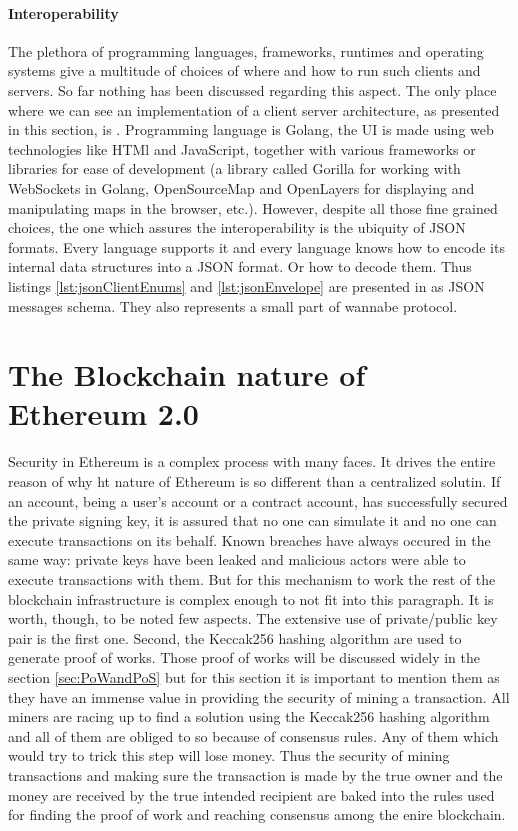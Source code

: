\documentclass[a4paper,12pt,twoside]{book}
\begin{document}
    \paragraph{Interoperability} The plethora of programming languages, frameworks, runtimes and operating systems give a multitude of choices of where and how to run such clients and servers. So far nothing has been discussed regarding this aspect. The only place where we can see an implementation of a client server architecture, as presented in this section, is \cite{MicroservicesCityTrafficSimulation}. Programming language is Golang, the UI is made using web technologies like HTMl and JavaScript, together with various frameworks or libraries for ease of development (a library called Gorilla for working with WebSockets in Golang, OpenSourceMap and OpenLayers for displaying and manipulating maps in the browser, etc.). However, despite all those fine grained choices, the one which assures the interoperability is the ubiquity of JSON formats. Every language supports it and every language knows how to encode its internal data structures into a JSON format. Or how to decode them. Thus listings \ref{lst:jsonClientEnums} and \ref{lst:jsonEnvelope} are presented in as JSON messages schema. They also represents a small part of wannabe protocol.

\section{The Blockchain nature of Ethereum 2.0}
\label{sec:EthereumNature}

    Security in Ethereum is a complex process with many faces. It drives the entire reason of why ht nature of Ethereum is so different than a centralized solutin. If an account, being a user's account or a contract account, has successfully secured the private signing key, it is assured that no one can simulate it and no one can execute transactions on its behalf. Known breaches have always occured in the same way: private keys have been leaked and malicious actors were able to execute transactions with them. But for this mechanism to work the rest of the blockchain infrastructure is complex enough to not fit into this paragraph. It is worth, though, to be noted few aspects. The extensive use of private/public key pair is the first one. Second, the Keccak256 hashing algorithm are used to generate proof of works. Those proof of works will be discussed widely in the section \ref{sec:PoWandPoS} but for this section it is important to mention them as they have an immense value in providing the security of mining a transaction. All miners are racing up to find a solution using the Keccak256 hashing algorithm and all of them are obliged to so because of consensus rules. Any of them which would try to trick this step will lose money. Thus the security of mining transactions and making sure the transaction is made by the true owner and the money are received by the true intended recipient are baked into the rules used for finding the proof of work and reaching consensus among the enire blockchain.
\end{document}
